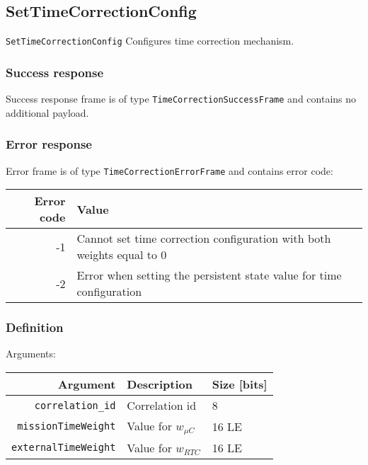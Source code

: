 \newcommand{\deltaMcu}{\Delta t_{\mu C}}
\newcommand{\deltaRtc}{\Delta t_{RTC}}
\newcommand{\wMcu}{w_{\mu C}}
\newcommand{\wRtc}{w_{RTC}}
\newcommand{\correctionValue}{\Delta t}

\subsection{SetTimeCorrectionConfig}
\texttt{SetTimeCorrectionConfig} Configures time correction mechanism.

\subsubsection{Success response}
Success response frame is of type \texttt{TimeCorrectionSuccessFrame} and contains no additional payload.

\subsubsection{Error response}
Error frame is of type \texttt{TimeCorrectionErrorFrame} and contains error code:

\begin{tabular}{r | l}
    Error code & Value \\
    \hline
    -1 & Cannot set time correction configuration with both weights equal to 0 \\
    -2 & Error when setting the persistent state value for time configuration \\
    
\end{tabular}

\subsubsection{Definition}

Arguments: 

\begin{tabular}{r | l | l}
    Argument                    & Description               & Size [bits] \\
    \hline
    \texttt{correlation\_id}    & Correlation id            & 8 \\
    \texttt{missionTimeWeight}  & Value for \hyperref[sec:time-wMcu]{$\wMcu$} & 16 LE \\
    \texttt{externalTimeWeight} & Value for \hyperref[sec:time-wRtc]{$\wRtc$} & 16 LE \\

\end{tabular}

